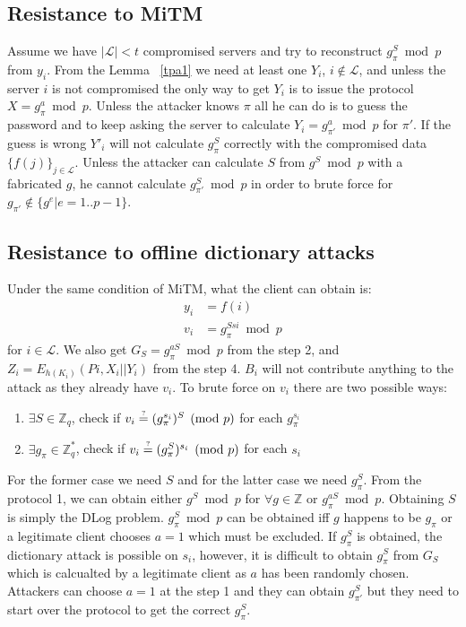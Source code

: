 \subsection{Resistance to MiTM}
Assume we have $|\mathcal{L}| < t$ compromised servers and try to
reconstruct $g_{\pi}^S \bmod p$ from ${y_i}$. From the Lemma
~\ref{tpa1} we need at least one $Y_i$, $i \notin \mathcal{L}$, and
unless the server $i$ is not compromised the only way to get $Y_i$ is
to issue the protocol $X = g_{\pi}^a \bmod p$. Unless the attacker
knows $\pi$ all he can do is to guess the password and to keep asking
the server to calculate $Y_i = g_{\pi'}^a \bmod p$ for $\pi'$. If the
guess is wrong $Y'_i$ will not calculate $g_{\pi}^S$ correctly with
the compromised data $\{f(j)\}_{j \in \mathcal{L}}$.
Unless the attacker can calculate $S$ from $g^S \bmod p$ with a
fabricated $g$, he cannot calculate $g_{\pi'}^S \bmod p$ in
order to brute force for $g_{\pi'} \notin \{g^e | e = 1..p-1\}$.

\subsection{Resistance to offline dictionary attacks}
Under the same condition of MiTM, what the client can obtain is:
\begin{align*}
  y_i &= f(i) \\
  v_i &= g_{\pi}^{Ssi} \bmod p
\end{align*}
for $i \in \mathcal{L}$. We also get $G_S = g_{\pi}^{aS} \bmod p$ from
the step 2, and $Z_i = E_{h(K_i)}(Pi, X_i||Y_i)$ from the step
4. $B_i$ will not contribute anything to the attack as they already
have $v_i$.
To brute force on $v_i$ there are two possible ways:
\begin{enumerate}
\item $\exists S \in \mathbb{Z}_q$, check if
  $v_i \stackrel{\text{\tiny ?}}{=} (g_{\pi}^{s_i})^S \pmod p$
  for each $g_{\pi}^{s_i}$ \\
\item $\exists g_{\pi} \in \mathbb{Z}^*_q$, check if
  $v_i \stackrel{\text{\tiny ?}}{=} (g_{\pi}^S)^{s_i} \pmod p$
  for each $s_i$
\end{enumerate}
For the former case we need $S$ and for the latter case we need
$g_{\pi}^S$. From the protocol 1, we can obtain either $g^S \bmod p$
for $\forall g \in \mathbb{Z}$ or $g_{\pi}^{aS} \bmod p$. Obtaining
$S$ is simply the {\sf DLog} problem. $g_{\pi}^S \bmod p$ can be
obtained iff $g$ happens to be $g_{\pi}$ or a legitimate client
chooses $a = 1$ which must be excluded.
If $g_{\pi}^S$ is obtained, the dictionary attack is possible on
$s_i$, however, it is difficult to obtain $g_{\pi}^S$ from $G_S$ which
is calcualted by a legitimate client as $a$ has been randomly
chosen. Attackers can choose $a = 1$ at the step 1 and they can obtain
$g_{\pi'}^S$ but they need to start over the protocol to get the
correct $g_{\pi}^S$.
